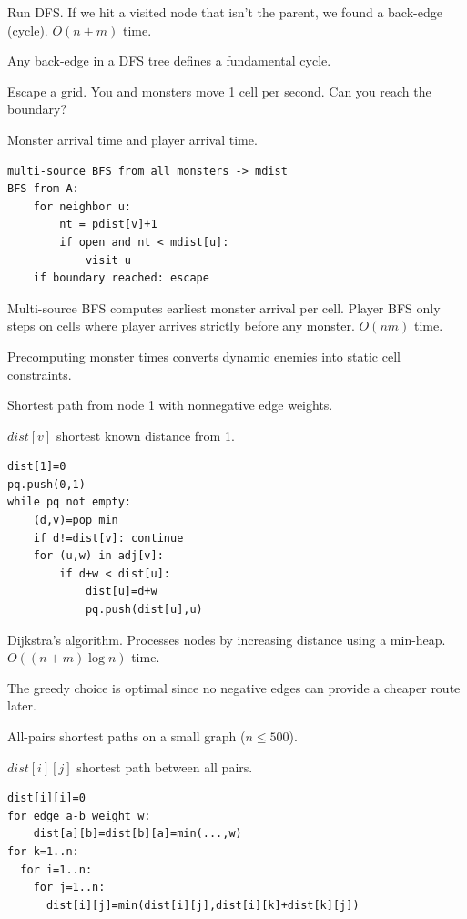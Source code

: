 \Solution Run DFS. If we hit a visited node that isn't the parent, we found a back-edge (cycle). $O(n+m)$ time.

\Analysis Any back-edge in a DFS tree defines a fundamental cycle.


\Problem Escape a grid. You and monsters move 1 cell per second. Can you reach the boundary?

\State Monster arrival time and player arrival time.
\begin{lstlisting}
multi-source BFS from all monsters -> mdist
BFS from A:
    for neighbor u:
        nt = pdist[v]+1
        if open and nt < mdist[u]:
            visit u
    if boundary reached: escape
\end{lstlisting}

\Solution Multi-source BFS computes earliest monster arrival per cell. Player BFS only steps on cells where player arrives strictly before any monster. $O(nm)$ time.

\Analysis Precomputing monster times converts dynamic enemies into static cell constraints.


\Problem Shortest path from node 1 with nonnegative edge weights.

\State $dist[v]$ shortest known distance from 1.
\begin{lstlisting}
dist[1]=0
pq.push(0,1)
while pq not empty:
    (d,v)=pop min
    if d!=dist[v]: continue
    for (u,w) in adj[v]:
        if d+w < dist[u]:
            dist[u]=d+w
            pq.push(dist[u],u)
\end{lstlisting}

\Solution Dijkstra's algorithm. Processes nodes by increasing distance using a min-heap. $O((n+m)\log n)$ time.

\Analysis The greedy choice is optimal since no negative edges can provide a cheaper route later.


\Problem All-pairs shortest paths on a small graph ($n \le 500$).

\State $dist[i][j]$ shortest path between all pairs.
\begin{lstlisting}
dist[i][i]=0
for edge a-b weight w:
    dist[a][b]=dist[b][a]=min(...,w)
for k=1..n:
  for i=1..n:
    for j=1..n:
      dist[i][j]=min(dist[i][j],dist[i][k]+dist[k][j])
\end{lstlisting}

